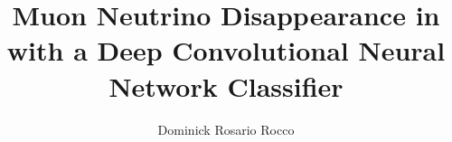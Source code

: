\phd %

\title{Muon Neutrino Disappearance in \nova with
       a Deep Convolutional Neural Network Classifier}
\author{Dominick Rosario Rocco}


\abstract{}
\copyrightpage %
\acknowledgements{}
\dedication{}


\beforepreface

\figurespage
\tablespage

\afterpreface
